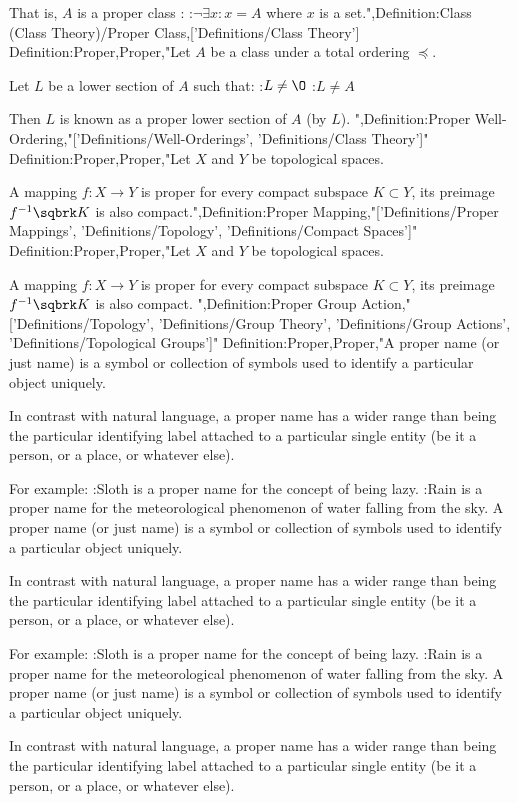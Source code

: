 That is, $A$ is a proper class :
:$\neg \exists x: x = A$
where $x$ is a set.",Definition:Class (Class Theory)/Proper Class,['Definitions/Class Theory']
Definition:Proper,Proper,"Let $A$ be a class under a total ordering $\preccurlyeq$.

Let $L$ be a lower section of $A$ such that:
:$L \ne \O$
:$L \ne A$

Then $L$ is known as a proper lower section of $A$ (by $L$).
",Definition:Proper Well-Ordering,"['Definitions/Well-Orderings', 'Definitions/Class Theory']"
Definition:Proper,Proper,"Let $X$ and $Y$ be topological spaces.


A mapping $f: X \to Y$ is proper  for every compact subspace $K \subset Y$, its preimage $f^{-1} \sqbrk K$ is also compact.",Definition:Proper Mapping,"['Definitions/Proper Mappings', 'Definitions/Topology', 'Definitions/Compact Spaces']"
Definition:Proper,Proper,"Let $X$ and $Y$ be topological spaces.


A mapping $f: X \to Y$ is proper  for every compact subspace $K \subset Y$, its preimage $f^{-1} \sqbrk K$ is also compact.
",Definition:Proper Group Action,"['Definitions/Topology', 'Definitions/Group Theory', 'Definitions/Group Actions', 'Definitions/Topological Groups']"
Definition:Proper,Proper,"A proper name (or just name) is a symbol or collection of symbols used to identify a particular object uniquely.


In contrast with natural language, a proper name has a wider range than being the particular identifying label attached to a particular single entity (be it a person, or a place, or whatever else).

For example:
:Sloth is a proper name for the concept of being lazy.
:Rain is a proper name for the meteorological phenomenon of water falling from the sky.
A proper name (or just name) is a symbol or collection of symbols used to identify a particular object uniquely.


In contrast with natural language, a proper name has a wider range than being the particular identifying label attached to a particular single entity (be it a person, or a place, or whatever else).

For example:
:Sloth is a proper name for the concept of being lazy.
:Rain is a proper name for the meteorological phenomenon of water falling from the sky.
A proper name (or just name) is a symbol or collection of symbols used to identify a particular object uniquely.


In contrast with natural language, a proper name has a wider range than being the particular identifying label attached to a particular single entity (be it a person, or a place, or whatever else).

